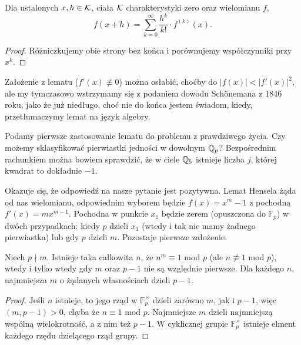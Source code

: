 \begin{fakt}
	Dla ustalonych $x, h \in \mathcal K$, ciała $\mathcal K$ charakterystyki zero oraz wielomianu $f$, 
	\[
		f(x+h) = \sum_{k = 0}^\infty\frac{h^k}{k!} \cdot f^{(k)}(x).
	\]
\end{fakt}

\begin{proof}
	Różniczkujemy obie strony bez końca i porównujemy współczynniki przy $x^k$.
\end{proof}

\begin{historia}\end{historia}

Założenie z lematu ($f'(x) \not\equiv 0$) można osłabić, choćby do $|f(x)| < |f'(x)|^2$, ale my tymczasowo wstrzymamy się z podaniem dowodu Schönemana z 1846 roku, jako że już niedługo, choć nie do końca jestem świadom, kiedy, przetłumaczymy lemat na język algebry.

\begin{historia}\end{historia} %

Podamy pierwsze zastosowanie lematu do problemu z prawdziwego życia.
Czy możemy sklasyfikować pierwiastki jedności w dowolnym $\mathbb Q_p$?
Bezpośrednim rachunkiem można bowiem sprawdzić, że w ciele $\mathbb Q_5$ istnieje liczba $j$, której kwadrat to dokładnie $-1$.

Okazuje się, że odpowiedź na nasze pytanie jest pozytywna.
Lemat Hensela żąda od nas wielomianu, odpowiednim wyborem będzie $f(x) = x^m-1$ z pochodną $f'(x) = mx^{m-1}$.
Pochodna w punkcie $x_1$ będzie zerem (opuszczona do $\mathbb F_p$) w dwóch przypadkach: kiedy $p$ dzieli $x_1$ (wtedy i tak nie mamy żadnego pierwiastka) lub gdy $p$ dzieli $m$.
Pozostaje pierwsze założenie.

\begin{lemat}
	Niech $p \nmid m$.
	Istnieje taka całkowita $n$, że $n^m \equiv 1$ mod $p$ (ale $n \not\equiv 1$ mod $p$), wtedy i tylko wtedy gdy $m$ oraz $p-1$ nie są względnie pierwsze.
	Dla każdego $n$, najmniejsza $m$ o żądanych własnościach dzieli $p-1$.
\end{lemat}

\begin{proof}
	Jeśli $n$ istnieje, to jego rząd w $\mathbb F_p^\times$ dzieli zarówno $m$, jak i $p-1$, więc $(m, p-1) > 0$, chyba że $n \equiv 1$ mod $p$.
	Najmniejsze $m$ dzieli najmniejszą wspólną wielokrotność, a z nim też $p-1$.
	W cyklicznej grupie $\mathbb F_p^\times$ istnieje elment każdego rzędu dzielącego rząd grupy.
\end{proof}

